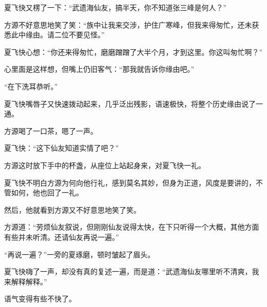 \begin{this_body}
夏飞快又楞了一下：“武遗海仙友，搞半天，你不知道张三峰是何人？”

方源不好意思地笑了笑：“族中让我来交涉，护住广寒峰，但我来得匆忙，还未获悉此中缘由。请二位不要见怪。”

夏飞快心想：“你还来得匆忙，磨磨蹭蹭了大半个月，才到这里。你这叫匆忙啊？”

心里面是这样想，但嘴上仍旧客气：“那我就告诉你缘由吧。”

“在下洗耳恭听。”

夏飞快嘴唇子又快速拨动起来，几乎泛出残影，语速极快，将整个历史缘由说了一通。

方源喝了一口茶，嗯了一声。

夏飞快：“这下仙友知道实情了吧？”

方源这时放下手中的杯盏，从座位上站起身来，对夏飞快一礼。

夏飞快不明白方源为何向他行礼，感到莫名其妙，但身为正道，风度是要讲的，不管如何，他也回了一礼。

然后，他就看到方源又不好意思地笑了笑。

方源道：“劳烦仙友叙说，但刚刚仙友说得太快，在下只听得一个大概，其他方面有些并未听清。还请仙友再说一遍。”

“再说一遍？”一旁的夏琢磨，顿时皱起了眉头。

夏飞快嗨了一声，却没有真的复述一遍，而是道：“武遗海仙友哪里听不清爽，我来解释解释。”

语气变得有些不快了。

\end{this_body}

